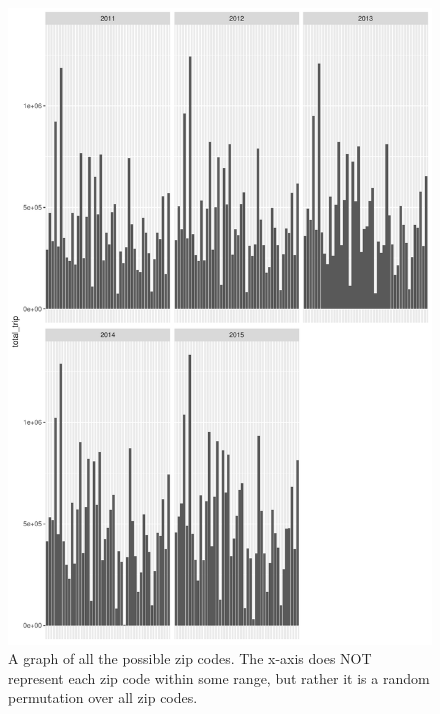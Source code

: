 \documentclass[12pt,twoside]{article}
\begin{document}
\newpage
\begin{figure} \label{figure4} 
\centerline{\includegraphics[scale=0.6]{Rplot04.pdf}}
\caption{A graph of all the possible zip codes. The x-axis does NOT represent each zip code within some range, but rather it is a random permutation over all zip codes.  }
\end{figure} 
\end{document}
